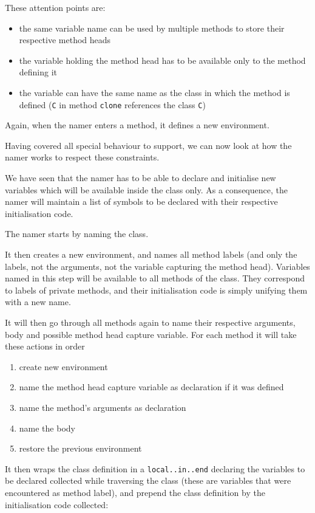 \documentclass[a4paper]{memoir}
\begin{document}
These attention points are:
\begin{itemize}
  \item the same variable name can be used by multiple methods to store their
    respective method heads
  \item the variable holding the method head has to be available only to the
    method defining it
  \item the variable can have the same name as the class in which the method is
    defined (\lstinline!C! in method \lstinline!clone! references the class \lstinline!C!)
\end{itemize}

Again, when the namer enters a method, it defines a new environment.

Having covered all special behaviour to support, we can now look at how the namer works to 
respect these constraints.

We have seen that the namer has to be able to declare and initialise new
variables which will be available inside the class only. As a consequence, the
namer will maintain a list of symbols to be declared with their respective
initialisation code.

The namer starts by naming the class.

It then creates a new environment, and names all method labels (and only the
labels, not the arguments, not the variable capturing the method head).
Variables named in this step will be available to all methods of the class.
They correspond to labels of private methods, and their initialisation code is
simply unifying them with a new name.

It will then go through all methods again to name their respective arguments,
body and possible method head capture variable. For each method it will take
these actions in order
\begin{enumerate}
  \item create new environment
  \item name the method head capture variable as declaration if it was defined
  \item name the method's arguments as declaration
  \item name the body
  \item restore the previous environment
\end{enumerate}

It then wraps the class definition in a \lstinline!local..in..end! declaring the
variables to be declared collected while traversing the class (these are
variables that were encountered as method label), and prepend the class
definition by the initialisation code collected:
\end{document}

